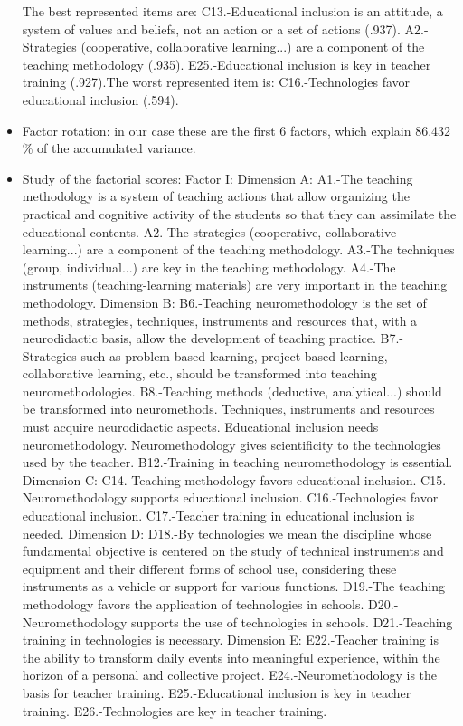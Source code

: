 \documentclass[english]{textolivre}
\begin{document}
\begin{itemize}
    The best represented items are: C13.-Educational inclusion is an attitude, a system of values and beliefs, not an action or a set of actions (.937). A2.-Strategies (cooperative, collaborative learning...) are a component of the teaching methodology (.935). E25.-Educational inclusion is key in teacher training (.927).The worst represented item is: C16.-Technologies favor educational inclusion (.594).
    \item Factor rotation: in our case these are the first 6 factors, which explain 86.432 \% of the accumulated variance.
    \item Study of the factorial scores: Factor I: Dimension A: A1.-The teaching methodology is a system of teaching actions that allow organizing the practical and cognitive activity of the students so that they can assimilate the educational contents. A2.-The strategies (cooperative, collaborative learning...) are a component of the teaching methodology. A3.-The techniques (group, individual...) are key in the teaching methodology. A4.-The instruments (teaching-learning materials) are very important in the teaching methodology. Dimension B: B6.-Teaching neuromethodology is the set of methods, strategies, techniques, instruments and resources that, with a neurodidactic basis, allow the development of teaching practice. B7.-Strategies such as problem-based learning, project-based learning, collaborative learning, etc., should be transformed into teaching neuromethodologies. B8.-Teaching methods (deductive, analytical...) should be transformed into neuromethods. Techniques, instruments and resources must acquire neurodidactic aspects. Educational inclusion needs neuromethodology. Neuromethodology gives scientificity to the technologies used by the teacher. B12.-Training in teaching neuromethodology is essential. Dimension C: C14.-Teaching methodology favors educational inclusion. C15.-Neuromethodology supports educational inclusion. C16.-Technologies favor educational inclusion. C17.-Teacher training in educational inclusion is needed. Dimension D: D18.-By technologies we mean the discipline whose fundamental objective is centered on the study of technical instruments and equipment and their different forms of school use, considering these instruments as a vehicle or support for various functions. D19.-The teaching methodology favors the application of technologies in schools. D20.-Neuromethodology supports the use of technologies in schools. D21.-Teaching training in technologies is necessary. Dimension E: E22.-Teacher training is the ability to transform daily events into meaningful experience, within the horizon of a personal and collective project. E24.-Neuromethodology is the basis for teacher training. E25.-Educational inclusion is key in teacher training. E26.-Technologies are key in teacher training.
\end{itemize}
\end{document}
